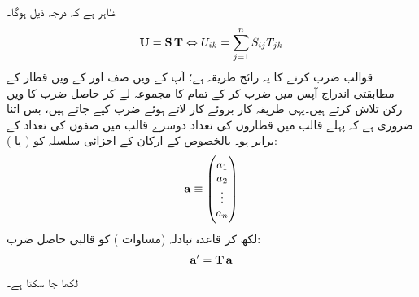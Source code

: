 ظاہر ہے کہ  درجہ ذیل ہوگا۔
\begin{align}
	\operatorname{\mathbf{U}} = \operatorname{\mathbf{S}}\operatorname{\mathbf{T}}\Leftrightarrow U_{ik}=\sum_{j=1}^{n}S_{ij}T_{jk}
\end{align}
قوالب ضرب کرنے کا   یہ رائج طریقہ ہے؛   آپ  کے ویں صف  اور  کے ویں قطار کے مطابقتی اندراج  آپس میں ضرب کر کے   تمام کا مجموعہ لے کر حاصل ضرب    کا  ویں  رکن تلاش کرتے  ہیں۔یہی طریقہ کار  بروئے کار لاتے  ہوئے    ضرب کیے جاتے ہیں،  بس اتنا ضروری ہے کہ پہلے قالب  میں قطاروں کی تعداد دوسرے قالب  میں صفوں کی تعداد کے برابر ہو۔ بالخصوص  کے ارکان کے   اجزائی سلسلہ کو    (  یا ):
\begin{align}
	\operatorname{\mathbf{a}} \equiv
	\begin{pmatrix}
		a_1\\a_2\\\vdots\\a_n
	\end{pmatrix}
\end{align}
لکھ کر قاعدہ  تبادلہ   (مساوات )  کو قالبی حاصل ضرب:
\begin{align}\label{مساوات_ضمیمہ_عمل_اظہار}
	\operatorname{\mathbf{a}}'=\operatorname{\mathbf{T}}\operatorname{\mathbf{a}}
\end{align}
 لکھا جا سکتا ہے۔

